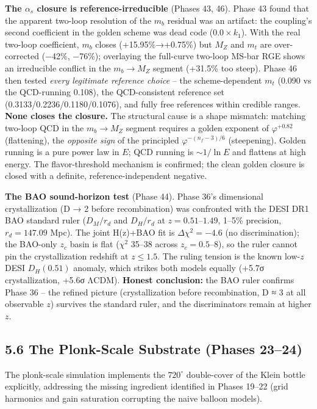 \documentclass[
  11pt,
]{article}
\begin{document}
\textbf{The \(\alpha_s\) closure is reference-irreducible} (Phases 43,
46). Phase 43 found that the apparent two-loop resolution of the \(m_b\)
residual was an artifact: the coupling's second coefficient in the
golden scheme was dead code (\(0.0 \times k_1\)). With the real two-loop
coefficient, \(m_b\) closes (+15.95\%→+0.75\%) but \(M_Z\) and \(m_t\)
are over-corrected (−42\%, −76\%); overlaying the full-curve two-loop
MS-bar RGE shows an irreducible conflict in the \(m_b \to M_Z\) segment
(+31.5\% too steep). Phase 46 then tested \emph{every legitimate
reference choice} -- the scheme-dependent \(m_t\) (0.090 vs the
QCD-running 0.108), the QCD-consistent reference set
(0.3133/0.2236/0.1180/0.1076), and fully free references within credible
ranges. \textbf{None closes the closure.} The structural cause is a
shape mismatch: matching two-loop QCD in the \(m_b \to M_Z\) segment
requires a golden exponent of \(\varphi^{+0.82}\) (flattening), the
\emph{opposite sign} of the principled \(\varphi^{-(n_f-3)/6}\)
(steepening). Golden running is a pure power law in \(E\); QCD running
is \(\sim 1/\ln E\) and flattens at high energy. The flavor-threshold
mechanism is confirmed; the clean golden closure is closed with a
definite, reference-independent negative.

\textbf{The BAO sound-horizon test} (Phase 44). Phase 36's dimensional
crystallization (D → 2 before recombination) was confronted with the
DESI DR1 BAO standard ruler (\(D_M/r_d\) and \(D_H/r_d\) at
\(z = 0.51\)--\(1.49\), 1--5\% precision, \(r_d = 147.09\) Mpc). The
joint H(z)+BAO fit is \(\Delta\chi^2 = -4.6\) (no discrimination); the
BAO-only \(z_c\) basin is flat (\(\chi^2\) 35--38 across
\(z_c = 0.5\)--8), so the ruler cannot pin the crystallization redshift
at \(z \le 1.5\). The ruling tension is the known low-\(z\) DESI
\(D_H(0.51)\) anomaly, which strikes both models equally (+5.7σ
crystallization, +5.6σ ΛCDM). \textbf{Honest conclusion:} the BAO ruler
confirms Phase 36 -- the refined picture (crystallization before
recombination, D ≈ 3 at all observable \(z\)) survives the standard
ruler, and the discriminators remain at higher \(z\).

\subsection{5.6 The Plonk-Scale Substrate (Phases
23--24)}\label{the-plonk-scale-substrate-phases-2324}

The plonk-scale simulation implements the \(720^{\circ}\) double-cover
of the Klein bottle explicitly, addressing the missing ingredient
identified in Phases 19--22 (grid harmonics and gain saturation
corrupting the naive balloon models).
\end{document}
